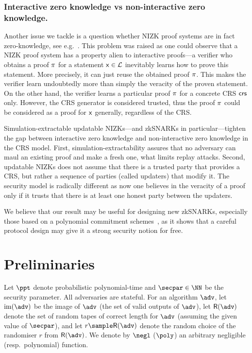 \let\accentvec\vec \documentclass[runningheads,10pt]{llncs}
\begin{document}
\subsubsection{Interactive zero knowledge vs non-interactive zero knowledge.}
Another issue we tackle is a question whether NIZK proof systems are in
fact zero-knowledge, see e.g.~\cite{C:Pass03}. This problem was raised as one
could observe that a NIZK proof system has a property alien to interactive
proofs---a verifier who obtains a proof $\pi$ for a statement $\mathsf{x} \in
\mathcal{L}$ inevitably learns how to prove this statement. More precisely, it can
just reuse the obtained proof $\pi$. This makes the verifier learn
undoubtedly more than simply the veracity of the proven statement. On the other
hand, the verifier learns a particular proof $\pi$ for a concrete CRS
$\mathsf{crs}$ only. However, the CRS generator is considered trusted, thus the proof
$\pi$ could be considered as a proof for $\mathsf{x}$ generally, regardless of the
CRS.

Simulation-extractable updatable NIZKs---and zkSNARKs in particular---tighten
the gap between interactive zero knowledge and non-interactive zero knowledge in
the CRS model. First, simulation-extractability assures that no adversary can
maul an existing proof and make a fresh one, what limits replay attacks.
Second, updatable NIZKs does not assume that there is a trusted party that
provides a CRS, but rather a sequence of parties (called updaters) that modify
it. The security model is radically different as now one believes in the
veracity of a proof only if it trusts that there is at least one honest party
between the updaters. 

We believe that our result may be useful for designing new zkSNARKs, especially those based on a polynomial commitment schemes~\cite{AC:KatZavGol10}, as it shows that a careful protocol design may give it a strong security notion for free.

\section{Preliminaries}
Let $\ppt$ denote probabilistic polynomial-time and $\secpar \in \NN$ be the
security parameter.  All adversaries are stateful.  For an algorithm $\adv$,
let $\image (\adv)$ be the image of $\adv$ (the set of valid outputs of
$\adv$), let $\RND{\adv}$ denote the set of random tapes of correct length for $\adv$ (assuming the given
value of $\secpar$), and let $r \sample \RND{\adv}$ denote the random choice
of the randomiser $r$ from $\RND{\adv}$.  We denote by $\negl$ ($\poly$) an
arbitrary negligible (resp.~polynomial) function.
\end{document}
